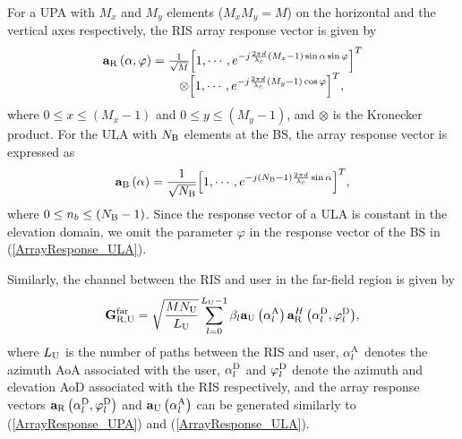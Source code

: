 \documentclass[lettersize, journal]{IEEEtran}
\begin{document}
For a UPA with $M_x$ and $M_y$ elements (${M_x}{M_y} = M$) on the horizontal and the vertical axes respectively, the RIS array response vector is given by
\begin{equation}\label{ArrayResponse_UPA}
\begin{array}{l}
{{\bf{a}}_{\rm{R}}}\left( {\alpha, \varphi } \right) = \frac{1}{{\sqrt {M} }}\Big[ 1, \cdots ,{e^{-j\frac{{2\pi d}}{\lambda_c }{\left( {{M_x} - 1} \right)\sin  \alpha  \sin \varphi  } }} \Big]^T   \\
\;\;\;\;\;\;\;\;\;\;\;\; \;\;\;\;\;\;\;\;\;\; \otimes \Big[ 1, \cdots ,e^{-j\frac{{2\pi d}}{\lambda_c } { \left( {{M_y} - 1} \right)\cos \varphi } } \Big]^T,
\end{array}
\end{equation}
where $0 \le x \le (M_x - 1)$ and $0 \le y \le (M_y - 1)$, and $\otimes$ is the Kronecker product. 
For the ULA with $N_{\rm{B}}$ elements at the BS, the array response vector is expressed as \cite{JSAC2016_mmWaveMIMO}
\begin{equation}\label{ArrayResponse_ULA}
{{\bf{a}}_{\rm{B}}}\left( \alpha  \right) = \frac{1}{{\sqrt {N_{\rm{B}}} }}{\left[ 1, \cdots ,{e^{-j\left( {N_{\rm{B}} - 1} \right)\frac{{2\pi d}}{\lambda_c }\sin \alpha }} \right]^T},
\end{equation}
where $0 \le n_b \le (N_{\rm{B}} - 1)$.
Since the response vector of a ULA is constant in the elevation domain, we omit the parameter ${\varphi }$ in the response vector of the BS in (\ref{ArrayResponse_ULA}).

Similarly, the channel between the RIS and user in the far-field region is given by
\begin{equation}
{\bf{G}}_{{\rm{R}}, {\rm{U}}}^{\rm{far}} =  \sqrt {\frac{{{M}{N_{\rm{U}}}}}{L_{\rm{U}}}}  \sum\limits_{l = 0}^{L_{\rm{U}}-1} {{\beta _l}{\bf{a}}_{\rm{U}}\left( {\alpha _l^{\rm{A}}} \right) {{\bf{a}}_{\rm{R}}^H}\left( {\alpha _l^{\rm{D}}}, {\varphi _l^{\rm{D}}} \right) },
\end{equation}
where $L_{\rm{U}}$ is the number of paths between the RIS and user, ${\alpha _l^{ {\rm{A}} }}$ denotes the azimuth AoA associated with the user, ${\alpha _l^{\rm{D}}}$ and ${\varphi _l^{\rm{D}}}$ denote the azimuth and elevation AoD associated with the RIS respectively, and the array response vectors ${\bf{a}}_{\rm{R}}\left( {\alpha _l^{\rm{D}}}, {\varphi _l^{\rm{D}}} \right)$ and ${\bf{a}}_{\rm{U}}\left( {\alpha _l^{ {\rm{A}} } } \right)$ can be generated similarly to (\ref{ArrayResponse_UPA}) and  (\ref{ArrayResponse_ULA}).
\end{document}
